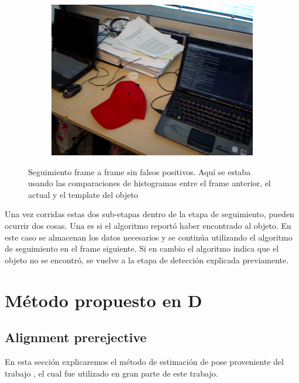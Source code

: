 \begin{figure}
\begin{subfigure}[b]{0.3\textwidth}
		\includegraphics[width=\textwidth]{img/seguimiento_frame_template/frame_template-desk_1-coffee_mug_5-frame_34.png}
	\end{subfigure}

	\caption{Seguimiento frame a frame sin falsos positivos. Aquí se estaba usando las comparaciones de histogramas entre el frame anterior, el actual y el template del objeto}
	\label{frame_template_tracking}
\end{figure}

Una vez corridas estas dos sub-etapas dentro de la etapa de seguimiento, pueden ocurrir dos cosas. Una es si el algoritmo reportó haber encontrado al objeto. En este caso se almacenan los datos necesarios y se continúa utilizando el algoritmo de seguimiento en el frame siguiente. Si en cambio el algoritmo indica que el objeto no se encontró, se vuelve a la etapa de detección explicada previamente.







\section{Método propuesto en D}\label{metodo_rgbd}
\subsection{Alignment prerejective}\label{alignment_prerejective}
En esta sección explicaremos el método de estimación de pose proveniente del trabajo \cite{6630856}, el cual fue utilizado en gran parte de este trabajo.

